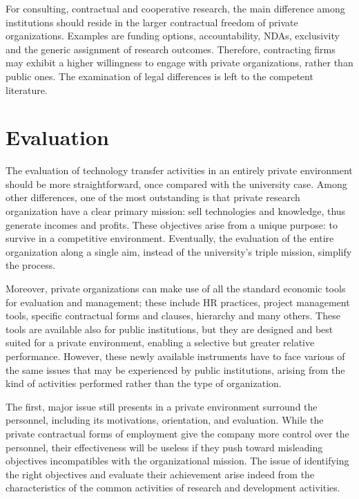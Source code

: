 For consulting, contractual and cooperative research, the main difference among institutions should reside in the larger contractual freedom of private organizations. Examples are funding options, accountability, NDAs, exclusivity and the generic assignment of research outcomes. Therefore, contracting firms may exhibit a higher willingness to engage with private organizations, rather than public ones. The examination of legal differences is left to the competent literature.

\section{Evaluation}

The evaluation of technology transfer activities in an entirely private environment should be more straightforward, once compared with the university case. Among other differences, one of the most outstanding is that private research organization have a clear primary mission: sell technologies and knowledge, thus generate incomes and profits. These objectives arise from a unique purpose: to survive in a competitive environment. Eventually, the evaluation of the entire organization along a single aim, instead of the university's triple mission, simplify the process. 

Moreover, private organizations can make use of all the standard economic tools for evaluation and management; these include HR practices, project management tools, specific contractual forms and clauses, hierarchy and many others. These tools are available also for public institutions, but they are designed and best suited for a private environment, enabling a selective but greater relative performance. However, these newly available instruments have to face various of the same issues that may be experienced by public institutions, arising from the kind of activities performed rather than the type of organization.

The first, major issue still presents in a private environment surround the personnel, including its motivations, orientation, and evaluation. While the private contractual forms of employment give the company more control over the personnel, their effectiveness will be useless if they push toward misleading objectives incompatibles with the organizational mission. The issue of identifying the right objectives and evaluate their achievement arise indeed from the characteristics of the common activities of research and development activities.

